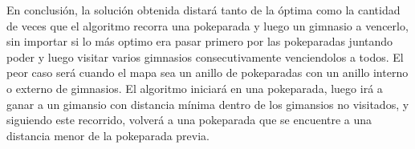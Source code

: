 En conclusi\'on, la soluci\'on obtenida distará tanto de la óptima como la cantidad de veces que el algoritmo recorra una pokeparada y luego un gimnasio a vencerlo, sin importar si lo más optimo era pasar primero por las pokeparadas juntando poder y luego visitar varios gimnasios consecutivamente venciendolos a todos.
El peor caso será cuando el mapa sea un anillo de pokeparadas con un anillo interno o externo de gimnasios. 
El algoritmo iniciará en una pokeparada, luego irá a ganar a un gimansio con distancia mínima dentro de los gimansios no visitados, y siguiendo este recorrido, volverá a una pokeparada que se encuentre a una distancia menor de la pokeparada previa.\\



